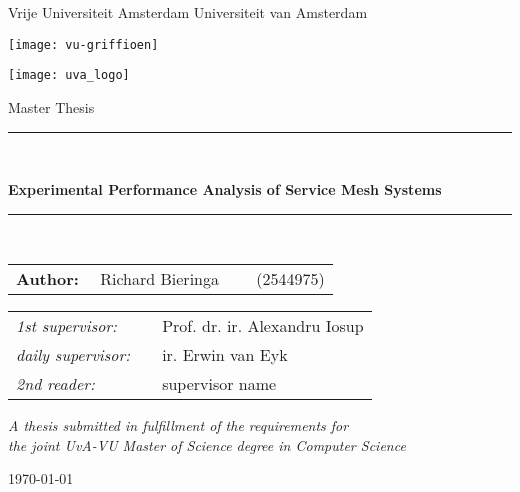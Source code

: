 \thispagestyle{empty}

\begin{center}
Vrije Universiteit Amsterdam \hspace*{2cm} Universiteit van Amsterdam

\vspace{1mm}

\hspace*{-7.5cm}\texttt{[image: vu-griffioen]}

\vspace*{-2cm}\hspace*{7.5cm}\texttt{[image: uva\_logo]}

\vspace{2cm}

{\Large Master Thesis}

\vspace*{1.5cm}

\rule{.9\linewidth}{.6pt}\\[0.4cm]
{\huge \bfseries 
    Experimental Performance Analysis of Service Mesh Systems
\par}\vspace{0.4cm}
\rule{.9\linewidth}{.6pt}\\[1.5cm]

\vspace*{2mm}

{\Large
\begin{tabular}{l}
{\bf Author:} ~~Richard Bieringa~~~~ (2544975)
\end{tabular}
}

\vspace*{1cm}

\begin{tabular}{ll}
{\it 1st supervisor:}   & ~~Prof. dr. ir. Alexandru Iosup \\
{\it daily supervisor:} & ~~ir. Erwin van Eyk \\
{\it 2nd reader:}       & ~~supervisor name
\end{tabular}

\vspace*{1cm}

\textit{A thesis submitted in fulfillment of the requirements for\\ the joint UvA-VU Master of Science degree in Computer Science}

\vspace*{1.8cm}

\today\\[4cm] %

\end{center}